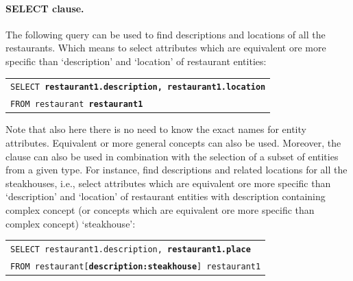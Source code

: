 \paragraph{SELECT clause.} 
The following query can be used to find descriptions and locations of all the restaurants. Which means to select attributes which are equivalent ore more specific than `description' and `location' of restaurant entities:
\begin{center}
\begin{tabular}{l}
\texttt{SELECT \textbf{restaurant1.description, restaurant1.location}} \\
\texttt{FROM restaurant \textbf{restaurant1}} \\
\end{tabular}
\end{center}
Note that also here there is no need to know the exact names for entity attributes. Equivalent or more general concepts can also be used. Moreover,
the clause can also be used in combination with the selection of a subset of entities from a given type. For instance, find descriptions and related locations for all the steakhouses, i.e., select attributes which are equivalent ore more specific than `description' and `location' of restaurant entities with description containing complex concept (or concepts which are equivalent ore more specific than complex concept) `steakhouse':
\begin{center}
\begin{tabular}{l}
\texttt{SELECT restaurant1.description, \textbf{restaurant1.place}} \\ 
\texttt{FROM restaurant[\textbf{description:steakhouse}] restaurant1} \\
\end{tabular}
\end{center}

